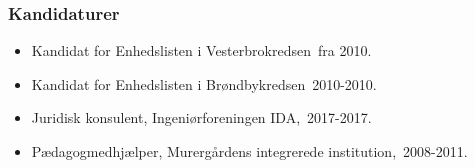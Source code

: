 \documentclass[11pt, a4paper]{awesome-cv}
\begin{document}
\begin{cvletter}
\subsubsection*{Kandidaturer}
\begin{itemize}
\item Kandidat for Enhedslisten i Vesterbrokredsen fra 2010.
\item Kandidat for Enhedslisten i Brøndbykredsen 2010-2010.
\end{itemize}
\begin{itemize}
\item Juridisk konsulent, Ingeniørforeningen IDA, 2017-2017.
\item Pædagogmedhjælper, Murergårdens integrerede institution, 2008-2011.
\end{itemize}
\end{cvletter}
\end{document}

